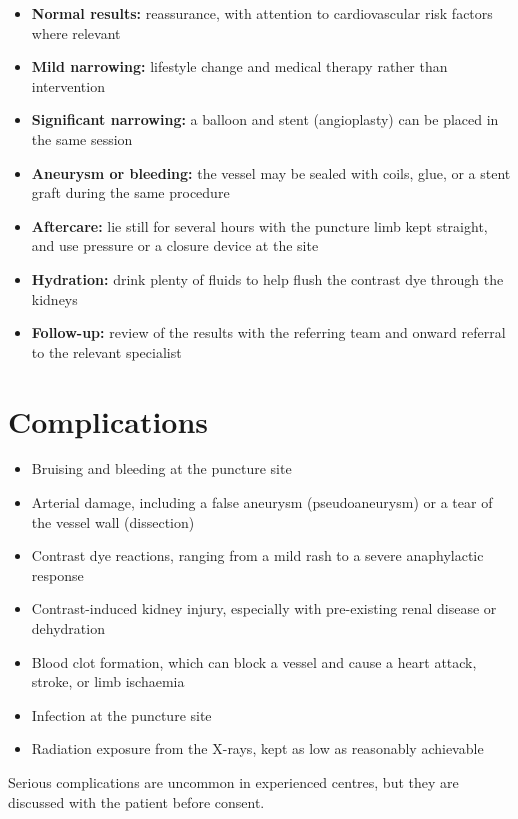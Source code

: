 \begin{itemize}
    \item \textbf{Normal results:} reassurance, with attention to cardiovascular risk factors where relevant
    \item \textbf{Mild narrowing:} lifestyle change and medical therapy rather than intervention
    \item \textbf{Significant narrowing:} a balloon and stent (angioplasty) can be placed in the same session
    \item \textbf{Aneurysm or bleeding:} the vessel may be sealed with coils, glue, or a stent graft during the same procedure
    \item \textbf{Aftercare:} lie still for several hours with the puncture limb kept straight, and use pressure or a closure device at the site
    \item \textbf{Hydration:} drink plenty of fluids to help flush the contrast dye through the kidneys
    \item \textbf{Follow-up:} review of the results with the referring team and onward referral to the relevant specialist
\end{itemize}

\section*{Complications}
\begin{itemize}
    \item Bruising and bleeding at the puncture site
    \item Arterial damage, including a false aneurysm (pseudoaneurysm) or a tear of the vessel wall (dissection)
    \item Contrast dye reactions, ranging from a mild rash to a severe anaphylactic response
    \item Contrast-induced kidney injury, especially with pre-existing renal disease or dehydration
    \item Blood clot formation, which can block a vessel and cause a heart attack, stroke, or limb ischaemia
    \item Infection at the puncture site
    \item Radiation exposure from the X-rays, kept as low as reasonably achievable
\end{itemize}

Serious complications are uncommon in experienced centres, but they are discussed with the patient before consent.

